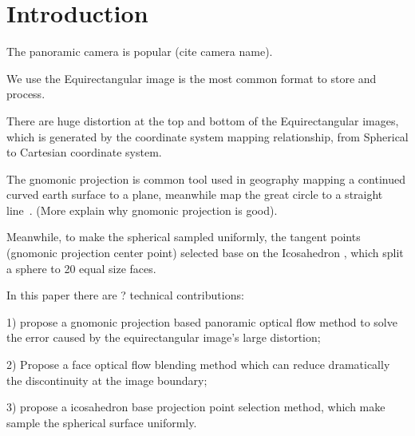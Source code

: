\section{Introduction}\label{sec:intro}

The panoramic camera is popular (cite camera name).

We use the Equirectangular image is the most common format to store and process.

There are huge distortion at the top and bottom of the Equirectangular images, which is generated by the coordinate system mapping relationship, from Spherical to Cartesian coordinate system.

The gnomonic projection is common tool used in geography mapping a continued curved earth surface to a plane, meanwhile map the great circle to a straight line~\cite{todo}. (More explain why gnomonic projection is good).

Meanwhile, to make the spherical sampled uniformly, the tangent points (gnomonic projection center point) selected base on the Icosahedron , which split a sphere to 20 equal size faces.

In this paper there are ? technical contributions:

1) propose a gnomonic projection based panoramic optical flow method to solve the error caused by the equirectangular image's large distortion;

2) Propose a face optical flow blending method which can reduce dramatically the discontinuity at the image boundary;

3) propose a icosahedron base projection point selection method, which make sample the spherical surface uniformly.


